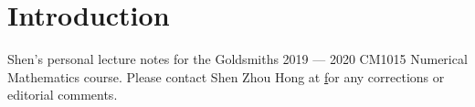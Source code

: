 \section*{Introduction}
Shen's personal lecture notes for the Goldsmiths 2019 --- 2020 CM1015 Numerical Mathematics course. Please contact Shen Zhou Hong at \href{mailto:sh333@student.london.ac.uk} for any corrections or editorial comments.

